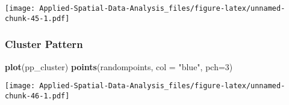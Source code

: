 \documentclass[
]{book}
\newenvironment{Shaded}{\begin{snugshade}}{\end{snugshade}}
\newcommand{\DataTypeTok}[1]{\textcolor[rgb]{0.13,0.29,0.53}{#1}}
\newcommand{\DecValTok}[1]{\textcolor[rgb]{0.00,0.00,0.81}{#1}}
\newcommand{\KeywordTok}[1]{\textcolor[rgb]{0.13,0.29,0.53}{\textbf{#1}}}
\newcommand{\NormalTok}[1]{#1}
\newcommand{\StringTok}[1]{\textcolor[rgb]{0.31,0.60,0.02}{#1}}
\begin{document}
\texttt{[image: Applied-Spatial-Data-Analysis\_files/figure-latex/unnamed-chunk-45-1.pdf]}

\hypertarget{cluster-pattern-1}{%
\subsubsection{Cluster Pattern}\label{cluster-pattern-1}}

\begin{Shaded}
\begin{Highlighting}[]
\KeywordTok{plot}\NormalTok{(pp_cluster)}
\KeywordTok{points}\NormalTok{(randompoints, }\DataTypeTok{col =} \StringTok{"blue"}\NormalTok{, }\DataTypeTok{pch=}\DecValTok{3}\NormalTok{)}
\end{Highlighting}
\end{Shaded}

\texttt{[image: Applied-Spatial-Data-Analysis\_files/figure-latex/unnamed-chunk-46-1.pdf]}
\end{document}

